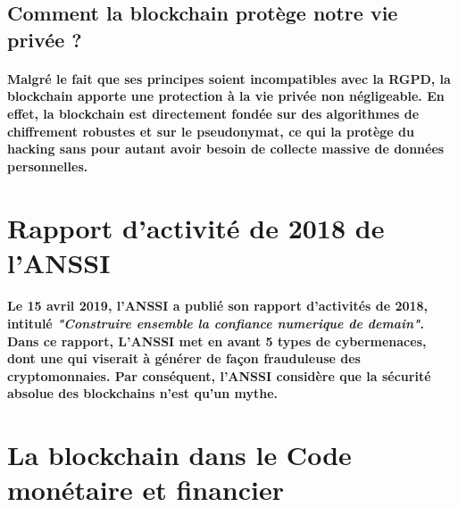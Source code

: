 \documentclass[12pt, a4paper, oneside]{book}
\begin{document}
    \subsection{Comment la blockchain protège notre vie privée ?}

    \paragraph{Malgré le fait que ses principes 
     soient incompatibles avec la RGPD, la blockchain apporte une protection à la vie privée non négligeable. 
     En effet, la blockchain est directement fondée sur des algorithmes de chiffrement robustes et sur le pseudonymat,
     ce qui la protège du hacking sans pour autant avoir besoin de collecte massive de données personnelles.
     \cite{reg}}

    \section{Rapport d'activité de 2018 de l'ANSSI}

    \paragraph{Le 15 avril 2019, l'ANSSI a publié son rapport d'activités de 2018, intitulé \textit{"Construire ensemble la confiance 
    numerique de demain"}. 
    Dans ce rapport, L'ANSSI met en avant 5 types de cybermenaces, dont une qui viserait à générer de façon frauduleuse des 
    cryptomonnaies. Par conséquent, l'ANSSI considère que la sécurité absolue des blockchains n'est qu'un mythe.
    \cite{anssi2018}}

    \section{La blockchain dans le Code monétaire et financier}
\end{document}

